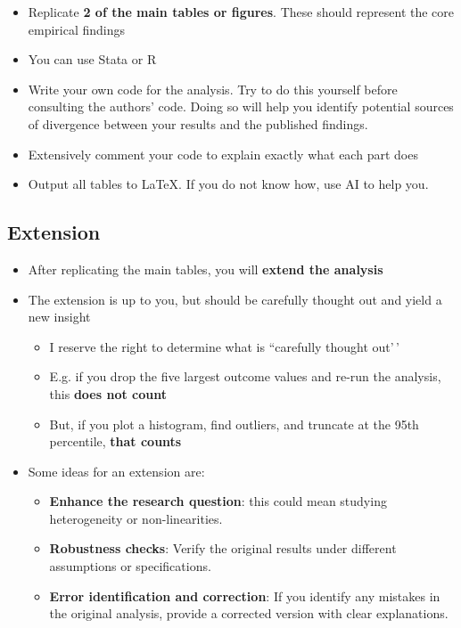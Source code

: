 \documentclass[
]{article}
\providecommand{\tightlist}{%
  \setlength{\itemsep}{0pt}\setlength{\parskip}{0pt}}
\begin{document}
\begin{itemize}
\tightlist
\item
  Replicate \textbf{2 of the main tables or figures}. These should represent the core empirical findings
\item
  You can use Stata or R
\item
  Write your own code for the analysis. Try to do this yourself before consulting the authors' code. Doing so will help you identify potential sources of divergence between your results and the published findings.
\item
  Extensively comment your code to explain exactly what each part does
\item
  Output all tables to LaTeX. If you do not know how, use AI to help you.
\end{itemize}

\hypertarget{extension}{%
\subsection{Extension}\label{extension}}

\begin{itemize}
\tightlist
\item
  After replicating the main tables, you will \textbf{extend the analysis}
\item
  The extension is up to you, but should be carefully thought out and yield a new insight

  \begin{itemize}
  \tightlist
  \item
    I reserve the right to determine what is ``carefully thought out'\,'
  \item
    E.g. if you drop the five largest outcome values and re-run the analysis, this \textbf{does not count}
  \item
    But, if you plot a histogram, find outliers, and truncate at the 95th percentile, \textbf{that counts}
  \end{itemize}
\item
  Some ideas for an extension are:

  \begin{itemize}
  \tightlist
  \item
    \textbf{Enhance the research question}: this could mean studying heterogeneity or non-linearities.
  \item
    \textbf{Robustness checks}: Verify the original results under different assumptions or specifications.
  \item
    \textbf{Error identification and correction}: If you identify any mistakes in the original analysis, provide a corrected version with clear explanations.
  \end{itemize}
\end{itemize}
\end{document}
